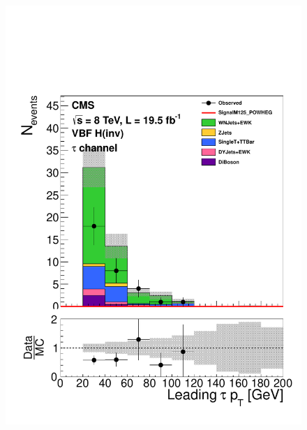 \begin{figure}
  \includegraphics[width=.6\largefigwidth]{plots/prompt/AN-12-403-figs/hWTau_tau1Pt.pdf}

\end{figure}
